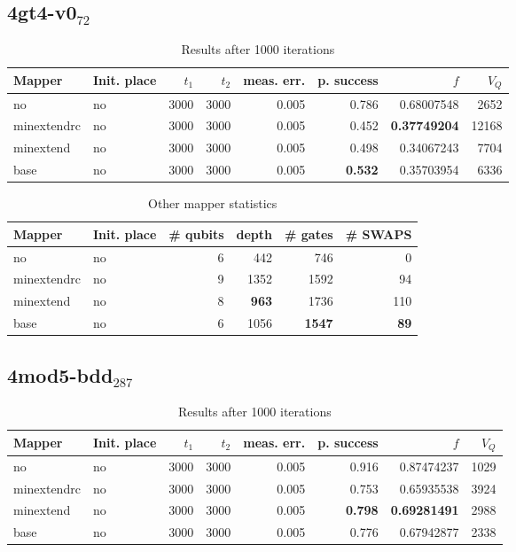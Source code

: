 \documentclass[11pt]{article}
\begin{document}
\subsection{4gt4-v0\(_{\text{72}}\)}
\label{sec:org2bc56c1}

\begin{table}[!htpb]
\caption{\label{tab:org025ebbe}
Results after 1000 iterations}
\centering
\begin{tabular}{llrrrrrr}
\hline
Mapper & Init. place & \(t_1\) & \(t_2\) & meas. err. & p. success & \(f\) & \(V_Q\)\\
\hline
no & no & 3000 & 3000 & 0.005 & 0.786 & 0.68007548 & 2652\\
\hline
minextendrc & no & 3000 & 3000 & 0.005 & 0.452 & \textbf{0.37749204} & 12168\\
minextend & no & 3000 & 3000 & 0.005 & 0.498 & 0.34067243 & 7704\\
base & no & 3000 & 3000 & 0.005 & \textbf{0.532} & 0.35703954 & 6336\\
\hline
\end{tabular}
\end{table}

\begin{table}[!htpb]
\caption{\label{tab:org7e23aaa}
Other mapper statistics}
\centering
\small
\begin{tabular}{llrrrr}
\hline
Mapper & Init. place & \# qubits & depth & \# gates & \# SWAPS\\
\hline
no & no & 6 & 442 & 746 & 0\\
\hline
minextendrc & no & 9 & 1352 & 1592 & 94\\
minextend & no & 8 & \textbf{963} & 1736 & 110\\
base & no & 6 & 1056 & \textbf{1547} & \textbf{89}\\
\hline
\end{tabular}
\end{table}

\subsection{4mod5-bdd\(_{\text{287}}\)}
\label{sec:org43b01e5}
\begin{table}[!htpb]
\caption{\label{tab:org49ea372}
Results after 1000 iterations}
\centering
\begin{tabular}{llrrrrrr}
\hline
Mapper & Init. place & \(t_1\) & \(t_2\) & meas. err. & p. success & \(f\) & \(V_Q\)\\
\hline
no & no & 3000 & 3000 & 0.005 & 0.916 & 0.87474237 & 1029\\
\hline
minextendrc & no & 3000 & 3000 & 0.005 & 0.753 & 0.65935538 & 3924\\
minextend & no & 3000 & 3000 & 0.005 & \textbf{0.798} & \textbf{0.69281491} & 2988\\
base & no & 3000 & 3000 & 0.005 & 0.776 & 0.67942877 & 2338\\
\hline
\end{tabular}
\end{table}
\end{document}
